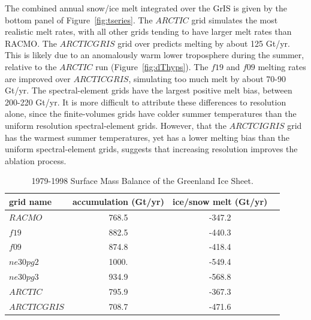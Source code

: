 \documentclass[draft]{agujournal2019}
\begin{document}
The combined annual snow/ice melt integrated over the GrIS is given by the bottom panel of Figure~\ref{fig:tseries}. The $ARCTIC$ grid simulates the most realistic melt rates, with all other grids tending to have larger melt rates than RACMO. The $ARCTICGRIS$ grid over predicts melting by about 125 Gt/yr. This is likely due to an anomalously warm lower troposphere during the summer, relative to the $ARCTIC$ run (Figure~\ref{fig:dThyps}). The $f19$ and $f09$ melting rates are improved over $ARCTICGRIS$, simulating too much melt by about 70-90 Gt/yr. The spectral-element grids have the largest positive melt bias, between 200-220 Gt/yr. It is more difficult to attribute these differences to resolution alone, since the finite-volumes grids have colder summer temperatures than the uniform resolution spectral-element grids. However, that the $ARCTCIGRIS$ grid has the warmest summer temperatures, yet has a lower melting bias than the uniform spectral-element grids, suggests that increasing resolution improves the ablation process.

 \begin{table}
 \centering
 \scriptsize
 \begin{tabular}{lccc}
   \hline
   grid name & accumulation (Gt/yr) & ice/snow melt (Gt/yr) \\ 
   \hline
   $RACMO$ & 768.5 & -347.2 \\
   \hline
   $f19$ & 882.5 & -440.3 \\
   $f09$ & 874.8 & -418.4 \\
   $ne30pg2$ & 1000. & -549.4 \\
   $ne30pg3$ & 934.9 & -568.8 \\
   $ARCTIC$ & 795.9 & -367.3 \\
   $ARCTICGRIS$ & 708.7 & -471.6 \\
 \hline
 \end{tabular}
  \caption{1979-1998 Surface Mass Balance of the Greenland Ice Sheet.}
 \label{tbl:table3}
 \end{table}
\end{document}
